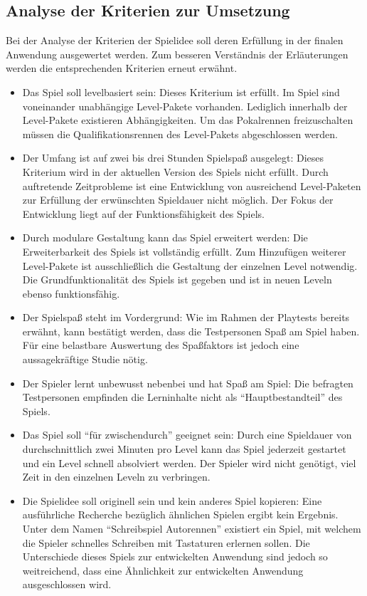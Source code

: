 \subsection{Analyse der Kriterien zur Umsetzung}
Bei der Analyse der Kriterien der Spielidee soll deren Erfüllung in der finalen Anwendung ausgewertet werden.
Zum besseren Verständnis der Erläuterungen werden die entsprechenden Kriterien erneut erwähnt.
\begin{itemize}
    \item{Das Spiel soll levelbasiert sein: Dieses Kriterium ist erfüllt. Im Spiel sind voneinander unabhängige Level-Pakete vorhanden. Lediglich innerhalb der Level-Pakete existieren Abhängigkeiten. Um das Pokalrennen freizuschalten müssen die Qualifikationsrennen des Level-Pakets abgeschlossen werden.}
    \item{Der Umfang ist auf zwei bis drei Stunden Spielspaß ausgelegt: Dieses Kriterium wird in der aktuellen Version des Spiels nicht erfüllt. Durch auftretende Zeitprobleme ist eine Entwicklung von ausreichend Level-Paketen zur Erfüllung der erwünschten Spieldauer nicht möglich. Der Fokus der Entwicklung liegt auf der Funktionsfähigkeit des Spiels.}
    \item{Durch modulare Gestaltung kann das Spiel erweitert werden: Die Erweiterbarkeit des Spiels ist vollständig erfüllt. Zum Hinzufügen weiterer Level-Pakete ist ausschließlich die Gestaltung der einzelnen Level notwendig. Die Grundfunktionalität des Spiels ist gegeben und ist in neuen Leveln ebenso funktionsfähig.}
    \item{Der Spielspaß steht im Vordergrund: Wie im Rahmen der Playtests bereits erwähnt, kann bestätigt werden, dass die Testpersonen Spaß am Spiel haben. Für eine belastbare Auswertung des Spaßfaktors ist jedoch eine aussagekräftige Studie nötig. }
    \item{Der Spieler lernt unbewusst nebenbei und hat Spaß am Spiel: Die befragten Testpersonen empfinden die Lerninhalte nicht als \enquote{Hauptbestandteil} des Spiels.}
    \item{Das Spiel soll \enquote{für zwischendurch} geeignet sein: Durch eine Spieldauer von durchschnittlich zwei Minuten pro Level kann das Spiel jederzeit gestartet und ein Level schnell absolviert werden. Der Spieler wird nicht genötigt, viel Zeit in den einzelnen Leveln zu verbringen.}
    \item{Die Spielidee soll originell sein und kein anderes Spiel kopieren: Eine ausführliche Recherche bezüglich ähnlichen Spielen ergibt kein Ergebnis. Unter dem Namen \enquote{Schreibspiel Autorennen} existiert ein Spiel, mit welchem die Spieler schnelles Schreiben mit Tastaturen erlernen sollen. Die Unterschiede dieses Spiels zur entwickelten Anwendung sind jedoch so weitreichend, dass eine Ähnlichkeit zur entwickelten Anwendung ausgeschlossen wird.}

\end{itemize}
